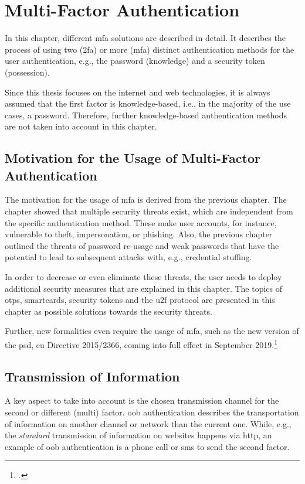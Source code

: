 \chapter{Multi-Factor Authentication}
\label{chap:mfa}

In this chapter, different \gls{mfa} solutions are described in detail. It describes the process of using two (\gls{2fa}) or more (\gls{mfa}) distinct authentication methods for the user authentication, e.g., the password (knowledge) and a security token (possession).

Since this thesis focuses on the internet and web technologies, it is always assumed that the first factor is knowledge-based, i.e., in the majority of the use cases, a password. Therefore, further knowledge-based authentication methods are not taken into account in this chapter.

\section{Motivation for the Usage of Multi-Factor Authentication}

The motivation for the usage of \gls{mfa} is derived from the previous chapter. The chapter showed that multiple security threats exist, which are independent from the specific authentication method. These make user accounts, for instance, vulnerable to theft, impersonation, or phishing. Also, the previous chapter outlined the threats of password re-usage and weak passwords that have the potential to lead to subsequent attacks with, e.g., credential stuffing.

 In order to decrease or even eliminate these threats, the user needs to deploy additional security measures that are explained in this chapter. The topics of \glspl{otp}, smartcards, security tokens and the \gls{u2f} protocol are presented in this chapter as possible solutions towards the security threats.
 
 Further, new formalities even require the usage of \gls{mfa}, such as the new version of the \gls{psd}, \gls{eu} Directive 2015/2366, coming into full effect in September 2019.\footcites[See][10]{NOCTOR20189}

\newpage

\section{Transmission of Information}

A key aspect to take into account is the chosen transmission channel for the second or different (multi) factor. \gls{oob} authentication describes the transportation of information on another channel or network than the current one. While, e.g., the \textit{standard} transmission of information on websites happens via \gls{http}, an example of \gls{oob} authentication is a phone call or \gls{sms} to send the second factor.

